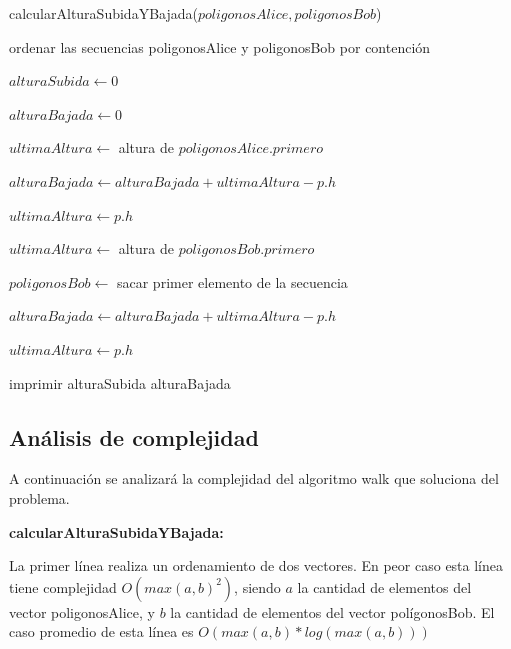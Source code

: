 \begin{algorithm}[H]
\linesnumbered
\caption{calcularAlturaSubidaYBajada($poligonosAlice, poligonosBob$)}
\vspace{0.4cm}

ordenar las secuencias poligonosAlice y poligonosBob por contención

$alturaSubida \gets 0$

$alturaBajada \gets 0$

 {
    $ultimaAltura \gets$ altura de $poligonosAlice.primero$
    
     {
         {
            $alturaBajada \gets alturaBajada + ultimaAltura - p.h$
        }
        
        $ultimaAltura \gets p.h$
    }
}

 {
     {
        $ultimaAltura \gets$ altura de $poligonosBob.primero$
        
        $poligonosBob \gets$ sacar primer elemento de la secuencia
    }
    
     {
         {
            $alturaBajada \gets alturaBajada + ultimaAltura - p.h$
        }
        
        $ultimaAltura \gets p.h$
    }
}

imprimir alturaSubida alturaBajada
\end{algorithm}

\subsection*{Análisis de complejidad}
A continuación se analizará la complejidad del algoritmo walk que soluciona del problema.

\textbf{calcularAlturaSubidaYBajada:}

La primer línea realiza un ordenamiento de dos vectores. En peor caso esta línea tiene complejidad
$O(max(a,b)^2)$, siendo $a$ la cantidad de elementos del vector poligonosAlice, y $b$ la cantidad de
elementos del vector polígonosBob. El caso promedio de esta línea es $O(max(a,b)*log(max(a,b)))$

